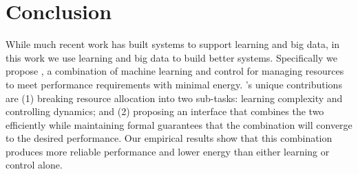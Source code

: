\section{Conclusion}
While much recent work has built systems to support learning and big
data, in this work we use learning and big data to build better
systems.  Specifically we propose \SYSTEM{}, a combination of machine
learning and control for managing resources to meet performance
requirements with minimal energy.  \SYSTEM{}'s unique contributions
are (1) breaking resource allocation into two sub-tasks: learning
complexity and controlling dynamics; and (2) proposing an interface
that combines the two efficiently while maintaining formal guarantees
that the combination will converge to the desired performance. Our
empirical results show that this combination produces more reliable
performance and lower energy than either learning or control alone.
